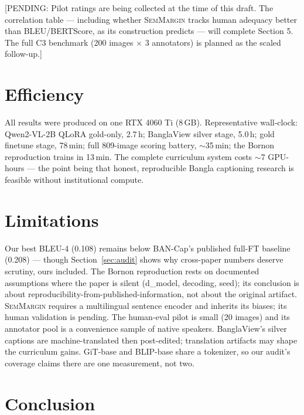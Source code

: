 \documentclass[11pt]{article}
\newcommand{\pending}[1]{\textcolor{red!70!black}{[PENDING: #1]}}
\newcommand{\semmargin}{\textsc{SemMargin}}
\begin{document}
\pending{Pilot ratings are being collected at the time of this draft.
The correlation table --- including whether \semmargin{} tracks human
adequacy better than BLEU/BERTScore, as its construction predicts ---
will complete Section 5. The full C3 benchmark (200 images $\times$ 3
annotators) is planned as the scaled follow-up.}

\section{Efficiency}

All results were produced on one RTX 4060 Ti (8\,GB). Representative
wall-clock: Qwen2-VL-2B QLoRA gold-only, 2.7\,h; BanglaView silver
stage, 5.0\,h; gold finetune stage, 78\,min; full 809-image scoring
battery, $\sim$35\,min; the Bornon reproduction trains in 13\,min. The
complete curriculum system costs $\sim$7 GPU-hours --- the point being
that honest, reproducible Bangla captioning research is feasible
without institutional compute.

\section{Limitations}

Our best BLEU-4 (0.108) remains below BAN-Cap's published full-FT
baseline (0.208) --- though Section~\ref{sec:audit} shows why
cross-paper numbers deserve scrutiny, ours included. The Bornon
reproduction rests on documented assumptions where the paper is
silent (d\_model, decoding, seed); its conclusion is about
reproducibility-from-published-information, not about the original
artifact. \semmargin{} requires a multilingual sentence encoder and
inherits its biases; its human validation is pending. The human-eval
pilot is small (20 images) and its annotator pool is a convenience
sample of native speakers. BanglaView's silver captions are
machine-translated then post-edited; translation artifacts may shape
the curriculum gains. GiT-base and BLIP-base share a tokenizer, so our
audit's coverage claims there are one measurement, not two.

\section{Conclusion}
\end{document}
